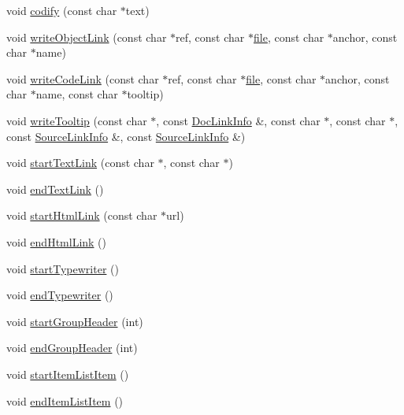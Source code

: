 \begin{DoxyCompactItemize}
\item 
void \hyperlink{class_latex_generator_a0013e3c0a103883ba879974c92b5a989}{codify} (const char $\ast$text)
\item 
void \hyperlink{class_latex_generator_a882b1439eadf3f6b28ba7ae0f8e22873}{write\+Object\+Link} (const char $\ast$ref, const char $\ast$\hyperlink{class_output_generator_aed5ad11c3844cdf71ec6fee6c1c84286}{file}, const char $\ast$anchor, const char $\ast$name)
\item 
void \hyperlink{class_latex_generator_af7b390d37f164fa8a094541e95be2bd0}{write\+Code\+Link} (const char $\ast$ref, const char $\ast$\hyperlink{class_output_generator_aed5ad11c3844cdf71ec6fee6c1c84286}{file}, const char $\ast$anchor, const char $\ast$name, const char $\ast$tooltip)
\item 
void \hyperlink{class_latex_generator_aa25f1930cd87edac4db7452bddb05825}{write\+Tooltip} (const char $\ast$, const \hyperlink{struct_doc_link_info}{Doc\+Link\+Info} \&, const char $\ast$, const char $\ast$, const \hyperlink{struct_source_link_info}{Source\+Link\+Info} \&, const \hyperlink{struct_source_link_info}{Source\+Link\+Info} \&)
\item 
void \hyperlink{class_latex_generator_ae4ec8b6a0997e558994bfb9e6a8a0e79}{start\+Text\+Link} (const char $\ast$, const char $\ast$)
\item 
void \hyperlink{class_latex_generator_a99844d76a29239103359ea6690a37efe}{end\+Text\+Link} ()
\item 
void \hyperlink{class_latex_generator_a491cb262e91a3f16b37d5dd2017e2f6a}{start\+Html\+Link} (const char $\ast$url)
\item 
void \hyperlink{class_latex_generator_a28854e0713249d4ee70a0544b0ebfed5}{end\+Html\+Link} ()
\item 
void \hyperlink{class_latex_generator_a72fe56f1f20836344b8fdf003c1a442e}{start\+Typewriter} ()
\item 
void \hyperlink{class_latex_generator_a40c84d4660b7514fb336c18544005b52}{end\+Typewriter} ()
\item 
void \hyperlink{class_latex_generator_ad2a9b94fc5f35298fc6a1e96c3b1b7d4}{start\+Group\+Header} (int)
\item 
void \hyperlink{class_latex_generator_ab3f17e3b2554190c3f5440e02ef20cd6}{end\+Group\+Header} (int)
\item 
void \hyperlink{class_latex_generator_ae7a65542a815c62b5a55283fcc68d774}{start\+Item\+List\+Item} ()
\item 
void \hyperlink{class_latex_generator_a32c196e3b968d56ed445bb3bc090ca6b}{end\+Item\+List\+Item} ()

\end{DoxyCompactItemize}
